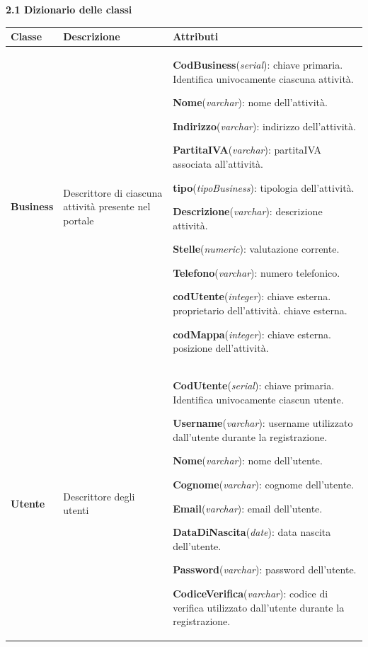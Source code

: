 \documentclass[a4paper,12pt]{article}
\begin{document}
\newpage

\newpage\null{}\setcounter{page}{7}
\vspace{-2cm}
\begin{flushleft}
{\bf 2.1 Dizionario delle classi} 
\vspace{+1cm}
\begin{table}[htbp]
\begin{tabular}[c]{| m{3cm} | m{5cm} | m{7cm} |}
\hline
\bf Classe&\bf Descrizione&\bf Attributi\\
\hline
{\bf Business}
&\small Descrittore di ciascuna attività presente nel portale
&\footnotesize
{\bf CodBusiness}({\it serial}): chiave primaria. Identifica univocamente ciascuna attività.

{\bf Nome}({\it varchar}): nome dell'attività.

{\bf Indirizzo}({\it varchar}): indirizzo dell'attività.

{\bf PartitaIVA}({\it varchar}): partitaIVA associata all'attività.

{\bf tipo}({\it tipoBusiness}): tipologia dell'attività.

{\bf Descrizione}({\it varchar}): descrizione attività.

{\bf Stelle}({\it numeric}): valutazione corrente.

{\bf Telefono}({\it varchar}): numero telefonico.

{\bf codUtente}({\it integer}): chiave esterna. proprietario dell'attività. chiave esterna.

{\bf codMappa}({\it integer}): chiave esterna. posizione dell'attività. 
\\
\hline

{\bf Utente}
&\small Descrittore degli utenti 
&\footnotesize
{\bf CodUtente}({\it serial}): chiave primaria. Identifica univocamente ciascun utente.

{\bf Username}({\it varchar}): username utilizzato dall'utente durante la
registrazione.

{\bf Nome}({\it varchar}): nome dell'utente.

{\bf Cognome}({\it varchar}): cognome dell'utente.

{\bf Email}({\it varchar}): email dell'utente.

{\bf DataDiNascita}({\it date}): data nascita dell'utente.

{\bf Password}({\it varchar}): password dell'utente.

{\bf CodiceVerifica}({\it varchar}): codice di verifica
utilizzato dall'utente durante la registrazione.


\end{tabular}
\end{table}
\end{flushleft}
\end{document}
